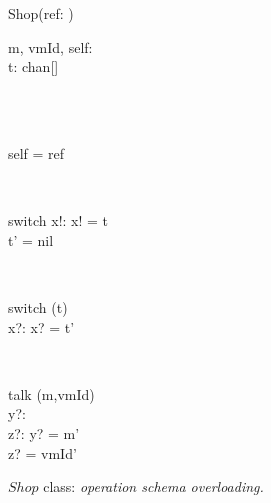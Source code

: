 \begin{figure}[H]
\centering
\begin{class}{Shop(ref: \integer)}
\\
\begin{state}
m, vmId, self: \integer
\\t: chan[\integer \times \integer]
\end{state} 
\\
\begin{init}
\\self = ref
\end{init} 
\\
\begin{op}{switch}
x!: \integer
\ST
x! = t
\\t' = nil
\end{op}
\\
\begin{op}{switch}
\Delta (t)
\\x?: \integer
\ST
x? = t'
\end{op}
\\
\begin{op}{talk}
\Delta (m,vmId)
\\y?: \integer
\\z?: \integer
\ST
y? = m'
\\z? = vmId'
\end{op}
\end{class}
\caption{$Shop$ class: \textit{operation schema overloading.}}
\label{fig_oz_overloaded_operation_shop}
\end{figure}